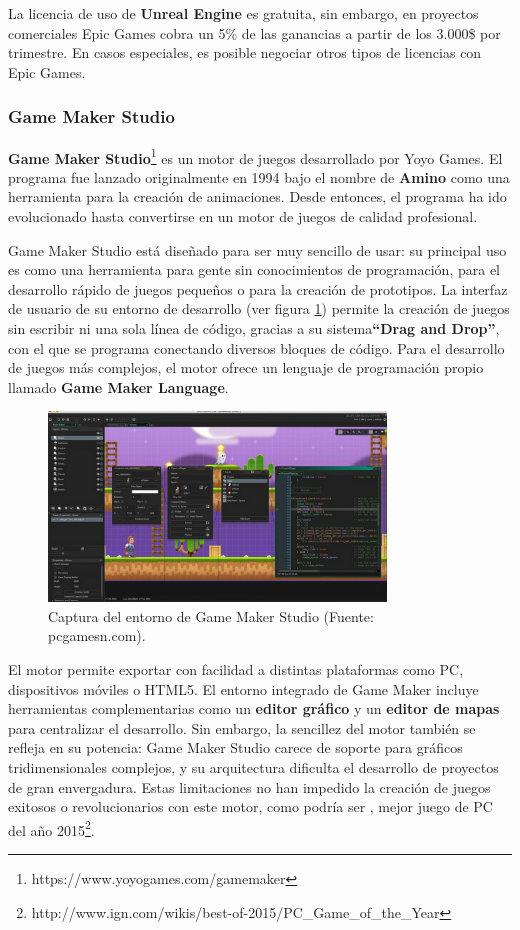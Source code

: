 La licencia de uso de \textbf{Unreal Engine} es gratuita, sin embargo, en proyectos comerciales Epic Games cobra un 5\% de las ganancias a partir de los 3.000\$ por trimestre. En casos especiales, es posible negociar otros tipos de licencias con Epic Games.

\subsubsection{Game Maker Studio}
\textbf{Game Maker Studio}\footnote{https://www.yoyogames.com/gamemaker} es un motor de juegos desarrollado por Yoyo Games. El programa fue lanzado originalmente en 1994 bajo el nombre de \textbf{Amino} como una herramienta para la creación de animaciones. Desde entonces, el programa ha ido evolucionado hasta convertirse en un motor de juegos de calidad profesional.

Game Maker Studio está diseñado para ser muy sencillo de usar: su principal uso es como una herramienta para gente sin conocimientos de programación, para el desarrollo rápido de juegos pequeños o para la creación de prototipos. La interfaz de usuario de su entorno de desarrollo (ver figura \ref{captura-game-maker}) permite la creación de juegos sin escribir ni una sola línea de código, gracias a su sistema\textbf{``Drag and Drop''}, con el que se programa conectando diversos bloques de código. Para el desarrollo de juegos más complejos, el motor ofrece un lenguaje de programación propio llamado \textbf{Game Maker Language}. 

\begin{figure}[h]
	\includegraphics[width=0.8\textwidth]{images/estadodelarte/motores/captura-game-maker}
	\centering
	\caption{Captura del entorno de Game Maker Studio (Fuente: pcgamesn.com).}
	\label{captura-game-maker}
\end{figure}

El motor permite exportar con facilidad a distintas plataformas como PC, dispositivos móviles o HTML5. El entorno integrado de Game Maker incluye herramientas complementarias como un \textbf{editor gráfico} y un \textbf{editor de mapas} para centralizar el desarrollo. Sin embargo, la sencillez del motor también se refleja en su potencia: Game Maker Studio carece de soporte para gráficos tridimensionales complejos, y su arquitectura dificulta el desarrollo de proyectos de gran envergadura. Estas limitaciones no han impedido la creación de juegos exitosos o revolucionarios con este motor, como podría ser , mejor juego de PC del año 2015\footnote{http://www.ign.com/wikis/best-of-2015/PC\_Game\_of\_the\_Year}.

